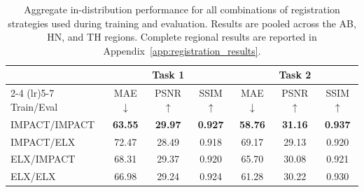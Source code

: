 \begin{table}[h!]
\centering
\fontsize{7.5}{9}\selectfont
\setlength{\tabcolsep}{2.2pt}
\renewcommand{\arraystretch}{1.18}
\caption{Aggregate in-distribution performance for all combinations of registration strategies used during training and evaluation. Results are pooled across the AB, HN, and TH regions. Complete regional results are reported in Appendix~\ref{app:registration_results}.
}
\label{tab:registration_consistency_aggregate}
\begin{tabular}{@{}lcccccc@{}}
\toprule
& \multicolumn{3}{c}{Task 1} & \multicolumn{3}{c}{Task 2} \\
\cmidrule(lr){2-4} \cmidrule(lr){5-7}
Train/Eval
& MAE $\downarrow$ & PSNR $\uparrow$ & SSIM $\uparrow$
& MAE $\downarrow$ & PSNR $\uparrow$ & SSIM $\uparrow$ \\
\midrule
IMPACT/IMPACT
& \textbf{63.55} & \textbf{29.97} & \textbf{0.927}
& \textbf{58.76} & \textbf{31.16} & \textbf{0.937} \\
IMPACT/ELX
& 72.47 & 28.49 & 0.918
& 69.17 & 29.13 & 0.920 \\
ELX/IMPACT
& 68.31 & 29.37 & 0.920
& 65.70 & 30.08 & 0.921 \\
ELX/ELX
& 66.98 & 29.24 & 0.924
& 61.28 & 30.22 & 0.930 \\
\bottomrule
\end{tabular}

\end{table}
